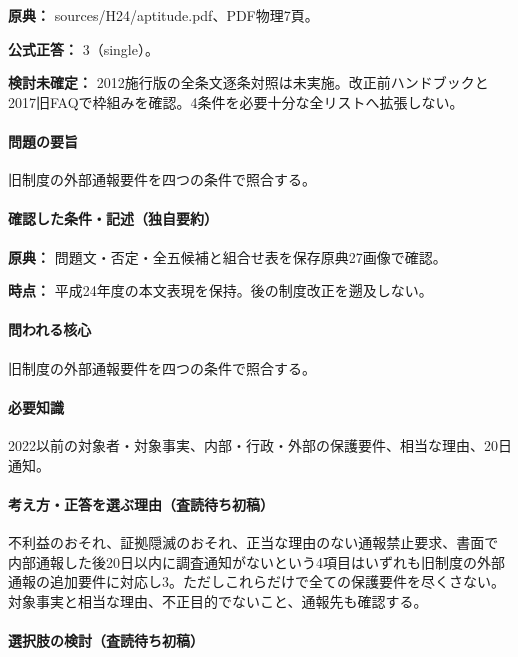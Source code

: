 \noindent\textbf{原典：} sources/H24/aptitude.pdf、PDF物理7頁。

\textbf{公式正答：} 3（single）。

\par\textbf{検討未確定：} 2012施行版の全条文逐条対照は未実施。改正前ハンドブックと2017旧FAQで枠組みを確認。4条件を必要十分な全リストへ拡張しない。

\paragraph{問題の要旨} 旧制度の外部通報要件を四つの条件で照合する。

\paragraph{確認した条件・記述（独自要約）}\mbox{}\par

\noindent\textbf{原典：} 問題文・否定・全五候補と組合せ表を保存原典27画像で確認。\par

\noindent\textbf{時点：} 平成24年度の本文表現を保持。後の制度改正を遡及しない。\par

\paragraph{問われる核心} 旧制度の外部通報要件を四つの条件で照合する。

\paragraph{必要知識} 2022以前の対象者・対象事実、内部・行政・外部の保護要件、相当な理由、20日通知。

\paragraph{考え方・正答を選ぶ理由（査読待ち初稿）} 不利益のおそれ、証拠隠滅のおそれ、正当な理由のない通報禁止要求、書面で内部通報した後20日以内に調査通知がないという4項目はいずれも旧制度の外部通報の追加要件に対応し3。ただしこれらだけで全ての保護要件を尽くさない。対象事実と相当な理由、不正目的でないこと、通報先も確認する。

\paragraph{選択肢の検討（査読待ち初稿）}\mbox{}\par

